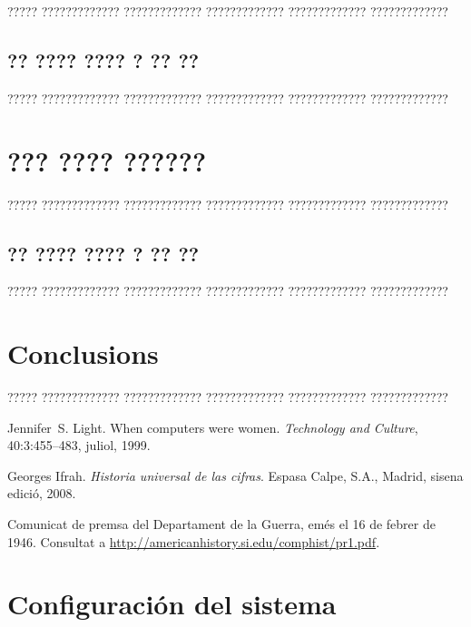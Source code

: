 \documentclass[11pt,spanish,listoffigures,listoftables]{tfgetsinf}
\begin{document}
????? ????????????? ????????????? ????????????? ????????????? ?????????????

\section{?? ???? ???? ? ?? ??}

????? ????????????? ????????????? ????????????? ????????????? ?????????????

\chapter{??? ???? ??????}

????? ????????????? ????????????? ????????????? ????????????? ????????????? 

\section{?? ???? ???? ? ?? ??}

????? ????????????? ????????????? ????????????? ????????????? ?????????????


\chapter{Conclusions}

????? ????????????? ????????????? ????????????? ????????????? ????????????? 


\begin{thebibliography}{10}

   Jennifer~S. Light.
   \newblock When computers were women.
   \newblock \textit{Technology and Culture}, 40:3:455--483, juliol, 1999.

   Georges Ifrah.
   \newblock \textit{Historia universal de las cifras}.
   \newblock Espasa Calpe, S.A., Madrid, sisena edició, 2008.

   Comunicat de premsa del Departament de la Guerra, 
   emés el 16 de febrer de 1946. 
   \newblock Consultat a 
   \url{http://americanhistory.si.edu/comphist/pr1.pdf}.

\end{thebibliography}
\cleardoublepage


\APPENDIX

\chapter{Configuración del sistema}
\end{document}
